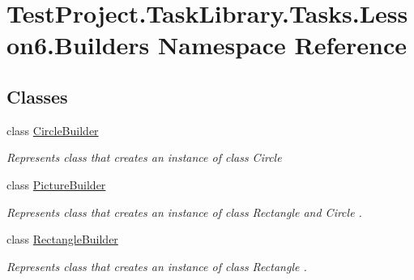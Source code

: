 \hypertarget{namespace_test_project_1_1_task_library_1_1_tasks_1_1_lesson6_1_1_builders}{}\section{Test\+Project.\+Task\+Library.\+Tasks.\+Lesson6.\+Builders Namespace Reference}
\label{namespace_test_project_1_1_task_library_1_1_tasks_1_1_lesson6_1_1_builders}
\subsection*{Classes}
\begin{DoxyCompactItemize}
\item 
class \mbox{\hyperlink{class_test_project_1_1_task_library_1_1_tasks_1_1_lesson6_1_1_builders_1_1_circle_builder}{Circle\+Builder}}
\begin{DoxyCompactList}\small\item\em Represents class that creates an instance of class Circle \end{DoxyCompactList}\item 
class \mbox{\hyperlink{class_test_project_1_1_task_library_1_1_tasks_1_1_lesson6_1_1_builders_1_1_picture_builder}{Picture\+Builder}}
\begin{DoxyCompactList}\small\item\em Represents class that creates an instance of class Rectangle and Circle . \end{DoxyCompactList}\item 
class \mbox{\hyperlink{class_test_project_1_1_task_library_1_1_tasks_1_1_lesson6_1_1_builders_1_1_rectangle_builder}{Rectangle\+Builder}}
\begin{DoxyCompactList}\small\item\em Represents class that creates an instance of class Rectangle . \end{DoxyCompactList}\end{DoxyCompactItemize}
